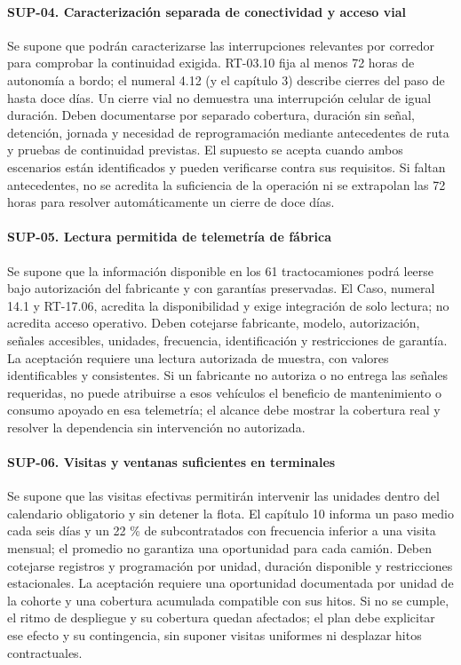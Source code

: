 \paragraph{SUP-04. Caracterización separada de conectividad y acceso vial}
Se supone que podrán caracterizarse las interrupciones relevantes por corredor para comprobar la continuidad exigida. RT-03.10 fija al menos 72 horas de autonomía a bordo; el numeral 4.12 (y el capítulo 3) describe cierres del paso de hasta doce días. Un cierre vial no demuestra una interrupción celular de igual duración. Deben documentarse por separado cobertura, duración sin señal, detención, jornada y necesidad de reprogramación mediante antecedentes de ruta y pruebas de continuidad previstas. El supuesto se acepta cuando ambos escenarios están identificados y pueden verificarse contra sus requisitos. Si faltan antecedentes, no se acredita la suficiencia de la operación ni se extrapolan las 72 horas para resolver automáticamente un cierre de doce días.

\paragraph{SUP-05. Lectura permitida de telemetría de fábrica}
Se supone que la información disponible en los 61 tractocamiones podrá leerse bajo autorización del fabricante y con garantías preservadas. El Caso, numeral 14.1 y RT-17.06, acredita la disponibilidad y exige integración de solo lectura; no acredita acceso operativo. Deben cotejarse fabricante, modelo, autorización, señales accesibles, unidades, frecuencia, identificación y restricciones de garantía. La aceptación requiere una lectura autorizada de muestra, con valores identificables y consistentes. Si un fabricante no autoriza o no entrega las señales requeridas, no puede atribuirse a esos vehículos el beneficio de mantenimiento o consumo apoyado en esa telemetría; el alcance debe mostrar la cobertura real y resolver la dependencia sin intervención no autorizada.

\paragraph{SUP-06. Visitas y ventanas suficientes en terminales}
Se supone que las visitas efectivas permitirán intervenir las unidades dentro del calendario obligatorio y sin detener la flota. El capítulo 10 informa un paso medio cada seis días y un 22 \% de subcontratados con frecuencia inferior a una visita mensual; el promedio no garantiza una oportunidad para cada camión. Deben cotejarse registros y programación por unidad, duración disponible y restricciones estacionales. La aceptación requiere una oportunidad documentada por unidad de la cohorte y una cobertura acumulada compatible con sus hitos. Si no se cumple, el ritmo de despliegue y su cobertura quedan afectados; el plan debe explicitar ese efecto y su contingencia, sin suponer visitas uniformes ni desplazar hitos contractuales.

